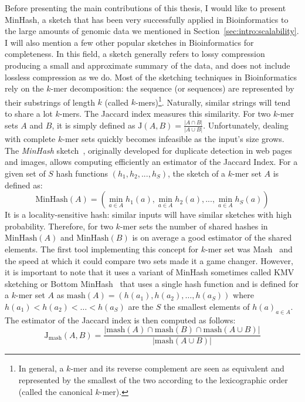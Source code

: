 Before presenting the main contributions of this thesis, I would like to present MinHash, a sketch that has been very successfully applied in Bioinformatics to the large amounts of genomic data we mentioned in Section~\ref{sec:intro:scalability}. I will also mention a few other popular sketches in Bioinformatics for completeness. 
In this field, a sketch generally refers to lossy compression producing a small and approximate summary of the data, and does not include lossless compression as we do.
Most of the sketching techniques in Bioinformatics rely on the $k$-mer decomposition: the sequence (or sequences) are represented by their substrings of length $k$ (called $k$-mers)\footnote{In general, a $k$-mer and its reverse complement are seen as equivalent and represented by the smallest of the two according to the lexicographic order (called the canonical $k$-mer).}.
Naturally, similar strings will tend to share a lot $k$-mers. The Jaccard index measures this similarity. For two $k$-mer sets $A$ and $B$, it is simply defined as $ \mathrm{J}(A,B) = \frac{|A\cap B|}{|A \cup B|} $.
Unfortunately, dealing with complete $k$-mer sets quickly becomes infeasible as the input's size grows. 
The \textit{MinHash} sketch~\cite{MinHash97}, originally developed for duplicate detection in web pages and images, allows computing efficiently an estimator of the Jaccard Index. 
For a given set of $S$ hash functions $(h_1,h_2,...,h_S)$, the sketch of a $k$-mer set $A$ is defined as: $$ \mathrm{MinHash}(A) = (\min_{a \in A} h_1(a), \min_{a \in A} h_2(a), ..., \min_{a \in A} h_S(a) ) $$
%
It is a locality-sensitive hash: similar inputs will have similar sketches with high probability. Therefore, for two $k$-mer sets the number of shared hashes in $\mathrm{MinHash}(A)$ and $\mathrm{MinHash}(B)$ is on average a good estimator of the shared elements.
The first tool implementing this concept for $k$-mer set was Mash~\cite{ondov2016mash} and the speed at which it could compare two sets made it a game changer. However, it is important to note that it uses a variant of MinHash sometimes called KMV sketching or Bottom MinHash~\cite{bar2002counting} that uses a single hash function and is defined for a $k$-mer set $A$ as $\mathrm{mash}(A)=(h(a_1),h(a_2), \dots ,h(a_S))$ where $h(a_1) < h(a_2) < \dots <h(a_S)$ are the $S$ the smallest elements of ${h(a)}_{a\in A}$.
The estimator of the Jaccard index is then computed as follows: $$ \mathrm{J}_{\mathrm{mash}}(A,B) = \frac{|\mathrm{mash}(A)\cap \mathrm{mash}(B) \cap \mathrm{mash}(A \cup B) |}{|\mathrm{mash}(A \cup B)|}$$
